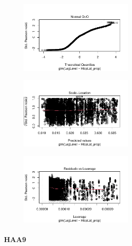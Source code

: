 \documentclass[
  letterpaper,
  DIV=11,
  numbers=noendperiod]{scrartcl}
\let\oldparagraph\paragraph
\renewcommand{\paragraph}[1]{\oldparagraph{#1}\mbox{}}
\begin{document}
\begin{figure}[H]

{\centering \includegraphics[width=0.5\textwidth,height=\textheight]{appendix_files/figure-pdf/unnamed-chunk-5-6.pdf}

}

\end{figure}

\begin{figure}[H]

{\centering \includegraphics[width=0.5\textwidth,height=\textheight]{appendix_files/figure-pdf/unnamed-chunk-5-7.pdf}

}

\end{figure}

\begin{figure}[H]

{\centering \includegraphics[width=0.5\textwidth,height=\textheight]{appendix_files/figure-pdf/unnamed-chunk-5-8.pdf}

}

\end{figure}

\hypertarget{haa9}{%
\paragraph{HAA9}\label{haa9}}
\end{document}
